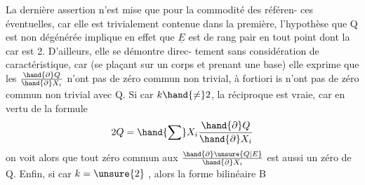La dernière assertion n'est mise que pour la commodité des référen-%
ces éventuelles, car elle est trivialement contenue dans la première,
l'hypothèse que Q est non dégénérée implique en effet que $\underline{E}$ est de rang
pair en tout point dont la car est 2. D'ailleurs, elle se démontre direc-%
tement sans considération de caractéristique, car (se plaçant sur un corps
 et prenant une base) elle exprime que les $\frac{\hand{\partial} Q}{\hand{\partial} X_i}$ n'ont pas de zéro commun
non trivial, à fortiori is n'ont pas de zéro commun non trivial avec Q.
Si car $k \hand{\neq} 2$, la réciproque est vraie, car en vertu de la formule
\[ 2Q = \hand{\sum} X_i \frac{\hand{\partial} Q}{\hand{\partial} X_i} \]
on voit alors que tout zéro commun aux $\frac{\hand{\partial} \unsure{Q|E}}{\hand{\partial} X_i}$ est aussi un zéro de Q. Enfin,
si car $k = \unsure{2}$ ,  alors la forme bilinéaire B

